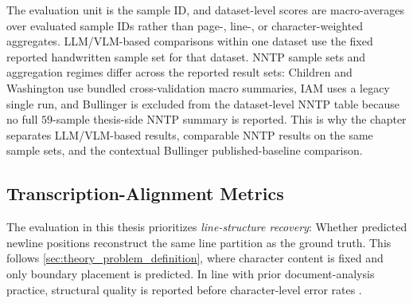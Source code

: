 The evaluation unit is the sample ID, and dataset-level scores are macro-averages over evaluated sample IDs rather than page-, line-, or character-weighted aggregates. LLM/VLM-based comparisons within one dataset use the fixed reported handwritten sample set for that dataset. NNTP sample sets and aggregation regimes differ across the reported result sets: Children and Washington use bundled cross-validation macro summaries, IAM uses a legacy single run, and Bullinger is excluded from the dataset-level NNTP table because no full \(59\)-sample thesis-side NNTP summary is reported. This is why the chapter separates LLM/VLM-based results, comparable NNTP results on the same sample sets, and the contextual Bullinger published-baseline comparison.

\subsection{Transcription-Alignment Metrics}
\label{sec:experimentation_line_alignment_metrics}

The evaluation in this thesis prioritizes \emph{line-structure recovery}: Whether predicted newline positions reconstruct the same line partition as the ground truth. This follows \autoref{sec:theory_problem_definition}, where character content is fixed and only boundary placement is predicted. In line with prior document-analysis practice, structural quality is reported before character-level error rates .

